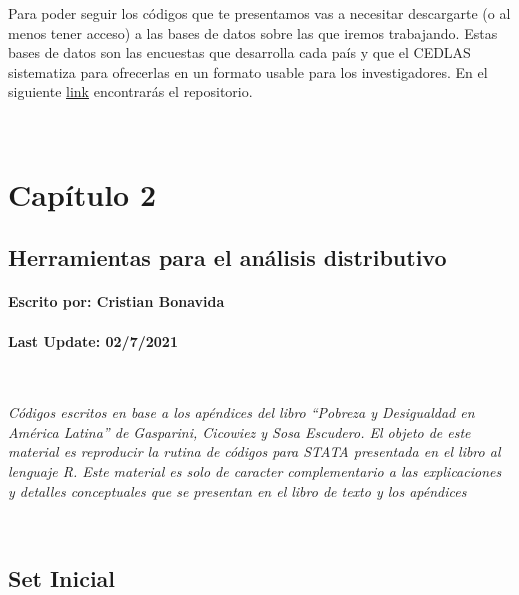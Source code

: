 \documentclass[
]{book}
\begin{document}
Para poder seguir los códigos que te presentamos vas a necesitar descargarte (o al menos tener acceso) a las bases de datos sobre las que iremos trabajando. Estas bases de datos son las encuestas que desarrolla cada país y que el CEDLAS sistematiza para ofrecerlas en un formato usable para los investigadores. En el siguiente \href{https://www.cedlas.econo.unlp.edu.ar/wp/publicaciones/libros/pobreza-y-desigualdad-en-america-latina/\#1505501369949-15c93bca-b4f8}{link} encontrarás el repositorio.

~

\hypertarget{capuxedtulo-2}{%
\chapter{Capítulo 2}\label{capuxedtulo-2}}

\hypertarget{herramientas-para-el-anuxe1lisis-distributivo}{%
\section*{Herramientas para el análisis distributivo}\label{herramientas-para-el-anuxe1lisis-distributivo}}

\hypertarget{escrito-por-cristian-bonavida}{%
\subsubsection*{Escrito por: Cristian Bonavida}\label{escrito-por-cristian-bonavida}}

\hypertarget{last-update-0272021}{%
\subsubsection*{Last Update: 02/7/2021}\label{last-update-0272021}}

~

\emph{Códigos escritos en base a los apéndices del libro ``Pobreza y Desigualdad en América Latina'' de Gasparini, Cicowiez y Sosa Escudero. El objeto de este material es reproducir la rutina de códigos para STATA presentada en el libro al lenguaje R. Este material es solo de caracter complementario a las explicaciones y detalles conceptuales que se presentan en el libro de texto y los apéndices}

~

\hypertarget{set-inicial}{%
\section*{Set Inicial}\label{set-inicial}}
\end{document}
